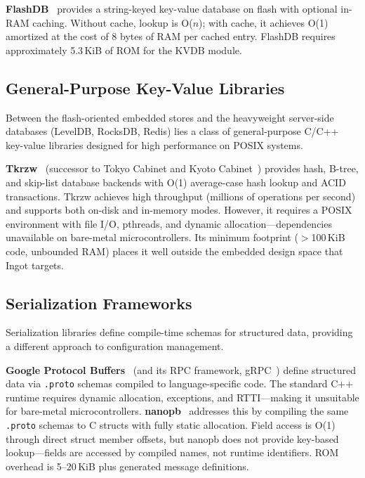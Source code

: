 \documentclass[10pt,twocolumn,letterpaper]{article}
\begin{document}
\textbf{FlashDB}~\cite{flashdb} provides a string-keyed key-value
database on flash with optional in-RAM caching.  Without cache,
lookup is O($n$); with cache, it achieves O(1) amortized at the cost
of 8 bytes of RAM per cached entry.  FlashDB requires approximately
5.3\,KiB of ROM for the KVDB module.

\subsection{General-Purpose Key-Value Libraries}

Between the flash-oriented embedded stores and the heavyweight
server-side databases (LevelDB, RocksDB, Redis) lies a class of
general-purpose C/C++ key-value libraries designed for high
performance on POSIX systems.

\textbf{Tkrzw}~\cite{tkrzw} (successor to Tokyo Cabinet and Kyoto
Cabinet~\cite{kyoto-cabinet}) provides hash, B-tree, and skip-list
database backends with O(1) average-case hash lookup and ACID
transactions.  Tkrzw achieves high throughput (millions of operations
per second) and supports both on-disk and in-memory modes.  However,
it requires a POSIX environment with file I/O, pthreads, and dynamic
allocation---dependencies unavailable on bare-metal microcontrollers.
Its minimum footprint ($>$100\,KiB code, unbounded RAM) places it
well outside the embedded design space that Ingot targets.

\subsection{Serialization Frameworks}

Serialization libraries define compile-time schemas for structured
data, providing a different approach to configuration management.

\textbf{Google Protocol Buffers}~\cite{protobuf} (and its RPC
framework, gRPC~\cite{grpc}) define structured data via
\texttt{.proto} schemas compiled to language-specific code.  The
standard C++ runtime requires dynamic allocation, exceptions, and
RTTI---making it unsuitable for bare-metal microcontrollers.
\textbf{nanopb}~\cite{nanopb} addresses this by compiling the same
\texttt{.proto} schemas to C structs with fully static allocation.
Field access is O(1) through direct struct member offsets, but nanopb
does not provide key-based lookup---fields are accessed by compiled
names, not runtime identifiers.  ROM overhead is 5--20\,KiB plus
generated message definitions.
\end{document}
